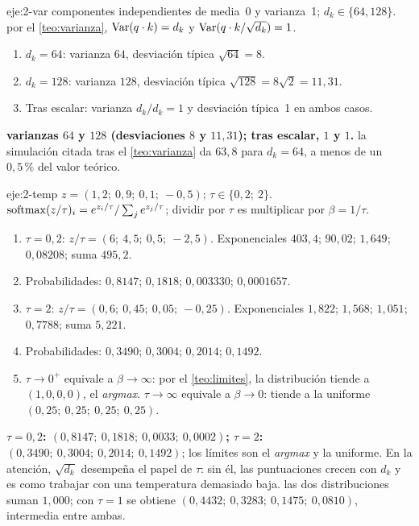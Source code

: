 \begin{solucion}{eje:2-var}
\datos componentes independientes de media~0 y varianza~1; $d_k\in\{64,128\}$.
\planteamiento por el \cref{teo:varianza}, $\operatorname{Var}(q\cdot k)=d_k$ y $\operatorname{Var}(q\cdot k/\sqrt{d_k})=1$.
\pasos
\begin{enumerate}[label=\arabic*.]
  \item $d_k=64$: varianza $64$, desviación típica $\sqrt{64}=8$.
  \item $d_k=128$: varianza $128$, desviación típica $\sqrt{128}=8\sqrt2=11{,}31$.
  \item Tras escalar: varianza $d_k/d_k=1$ y desviación típica~1 en ambos casos.
\end{enumerate}
\resultado \textbf{varianzas $64$ y $128$ (desviaciones $8$ y $11{,}31$); tras escalar, $1$ y $1$.}
\comprobacion la simulación citada tras el \cref{teo:varianza} da $63{,}8$ para $d_k=64$, a menos de un $0{,}5\,\%$ del valor teórico.
\end{solucion}

\begin{solucion}{eje:2-temp}
\datos $z=(1{,}2;\allowbreak\ 0{,}9;\allowbreak\ 0{,}1;\allowbreak\ -0{,}5)$; $\tau\in\{0{,}2;\allowbreak\ 2\}$.
\planteamiento $\operatorname{softmax}(z/\tau)_i=e^{z_i/\tau}/\sum_je^{z_j/\tau}$; dividir por $\tau$ es multiplicar por $\beta=1/\tau$.
\pasos
\begin{enumerate}[label=\arabic*.]
  \item $\tau=0{,}2$: $z/\tau=(6;\allowbreak\ 4{,}5;\allowbreak\ 0{,}5;\allowbreak\ -2{,}5)$. Exponenciales $403{,}4$; $90{,}02$; $1{,}649$; $0{,}08208$; suma $495{,}2$.
  \item Probabilidades: $0{,}8147$; $0{,}1818$; $0{,}003330$; $0{,}0001657$.
  \item $\tau=2$: $z/\tau=(0{,}6;\allowbreak\ 0{,}45;\allowbreak\ 0{,}05;\allowbreak\ -0{,}25)$. Exponenciales $1{,}822$; $1{,}568$; $1{,}051$; $0{,}7788$; suma $5{,}221$.
  \item Probabilidades: $0{,}3490$; $0{,}3004$; $0{,}2014$; $0{,}1492$.
  \item $\tau\to0^{+}$ equivale a $\beta\to\infty$: por el \cref{teo:limites}, la distribución tiende a $(1,0,0,0)$, el \emph{argmax}. $\tau\to\infty$ equivale a $\beta\to0$: tiende a la uniforme $(0{,}25;\allowbreak\ 0{,}25;\allowbreak\ 0{,}25;\allowbreak\ 0{,}25)$.
\end{enumerate}
\resultado \textbf{$\tau=0{,}2$: $(0{,}8147;\allowbreak\ 0{,}1818;\allowbreak\ 0{,}0033;\allowbreak\ 0{,}0002)$; $\tau=2$: $(0{,}3490;\allowbreak\ 0{,}3004;\allowbreak\ 0{,}2014;\allowbreak\ 0{,}1492)$}; los límites son el \emph{argmax} y la uniforme. En la atención, $\sqrt{d_k}$ desempeña el papel de $\tau$: sin él, las puntuaciones crecen con $d_k$ y es como trabajar con una temperatura demasiado baja.
\comprobacion las dos distribuciones suman $1{,}000$; con $\tau=1$ se obtiene $(0{,}4432;\allowbreak\ 0{,}3283;\allowbreak\ 0{,}1475;\allowbreak\ 0{,}0810)$, intermedia entre ambas.
\end{solucion}

